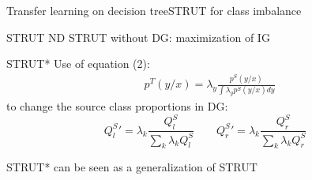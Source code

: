 \begin{frame}{Transfer learning on decision tree}{STRUT for class imbalance}

    \begin{block}{\centering STRUT ND}
    STRUT without DG: maximization of IG
    \end{block}
    \pause
    \begin{block}{\centering \textcolor{myorange}{STRUT*}}
    Use of equation (2):
    \begin{align}
        & p^T(y/x) = \lambda_y \frac{p^S(y/x)}{\int{\lambda_y p^S(y/x)dy}} \tag{2}
    \end{align}
    to change the source class proportions in DG:
    \begin{equation*}
    {Q_l^S} ' = \lambda_k\frac{ Q_l^S}{\sum \limits_{k}{ \lambda_{k}Q_l^S}} \quad \quad
    {Q_r^S} ' = \lambda_k\frac{ Q_r^S}{\sum \limits_{k}{ \lambda_{k}Q_r^S}} 
    \label{probcond}
    \end{equation*}
    \end{block}
    \pause
    \centering \textcolor{myorange}{STRUT*} can be seen as a generalization of STRUT
 
\end{frame}


